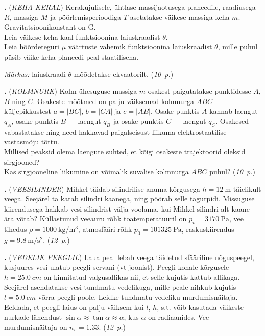 \documentclass[11pt,a5paper]{article}
\newcommand{\numb}[1]{\vspace{5pt}\textbf{\large #1}}
\newcommand{\nimi}[1]{(\textsl{\small #1})}
\newcommand{\punktid}[1]{(\emph{#1~p.})}
\newcounter{ylesanne}
\newcommand{\yl}[1]{\addtocounter{ylesanne}{1}\numb{\theylesanne.} \nimi{#1} \newblock{}}
\newcommand{\autor}[1]{}
\begin{document}
\yl{KEHA KERAL}
Kerakujulisele, ühtlase massijaotusega planeedile, raadiusega $R$, massiga $M$ ja pöörlemisperioodiga $T$ asetatakse väikese massiga keha $m$. Gravitatsioonikonstant on G.\\
\osa Leia väikese keha kaal funktsioonina laiuskraadist $\theta$.\\
\osa Leia hõõrdeteguri $\mu$ väärtuste vahemik funktsioonina laiuskraadist $\theta$, mille puhul püsib väike keha planeedi peal staatilisena. \par
\emph{Märkus:} laiuskraadi $\theta$ mõõdetakse ekvaatorilt.
\punktid{10} \autor{Krister Kasemaa}

\yl{KOLMNURK}
Kolm ühesuguse massiga $m$ osakest paigutatakse punktidesse $A$, $B$ ning $C$. Osakeste mõõtmed on palju väiksemad kolmnurga $ABC$ küljepikkustest $a=|BC|$, $b=|CA|$ ja $c=|AB|$. Osake punktis $A$ kannab laengut $q_A$, osake punktis $B$ --- laengut $q_B$ ja osake punktis $C$ --- laengut $q_C$. Osakesed vabastatakse ning need hakkavad paigalseisust liikuma elektrostaatilise vastasmõju tõttu.\\
\osa Millised peaksid olema laengute suhted, et kõigi osakeste trajektoorid oleksid sirgjooned?\\
\osa Kas sirgjooneline liikumine on võimalik suvalise kolmnurga $ABC$ puhul?
\punktid{10} \autor{Jaan Kalda}

\yl{VEESILINDER}
Mihkel täidab silindrilise anuma kõrgusega $h = \SI{12}{\m}$ täielikult veega. Seejärel ta katab silindri kaanega, ning pöörab selle tagurpidi. Missuguse kiirendusega hakkab vesi silindrist välja voolama, kui Mihkel silindri alt kaane ära võtab? Küllastunud veeauru rõhk toatemperatuuril on $p_v = \SI{3170}{\Pa}$, vee tihedus $\rho = \SI{1000}{\kg\per\m\cubed}$, atmosfääri rõhk $p_0 = \SI{101325}{\Pa}$, raskuskiirendus $g = \SI{9.8}{\m\per\s\squared}$.
\punktid{12} \autor{Taavet Kalda}

\yl{VEDELIK PEEGLIL}
Laua peal lebab veega täidetud sfääriline nõguspeegel, kusjuures vesi ulatub peegli servani (vt joonist). Peegli kohale kõrgusele $h=\SI{25.0}{cm}$ on kinnitatud valgusallikas nii, et selle kujutis kattub allikaga. Seejärel asendatakse vesi tundmatu vedelikuga, mille peale nihkub kujutis $l=\SI{5.0}{cm}$ võrra peegli poole. Leidke tundmatu vedeliku murdumisnäitaja. Eeldada, et peegli laius on palju väiksem kui $l$, $h$, s.t. võib kasutada väikeste nurkade lähendust $\sin \alpha \approx \tan \alpha \approx \alpha$, kus $\alpha$ on radiaanides. Vee murdumisnäitaja on $n_v=\num{1.33}$.
\punktid{12} \autor{Konstantis Dukatš}
\begin{figure}[h]
  \centering
\end{figure}
\vspace{-1.5em}
\end{document}
